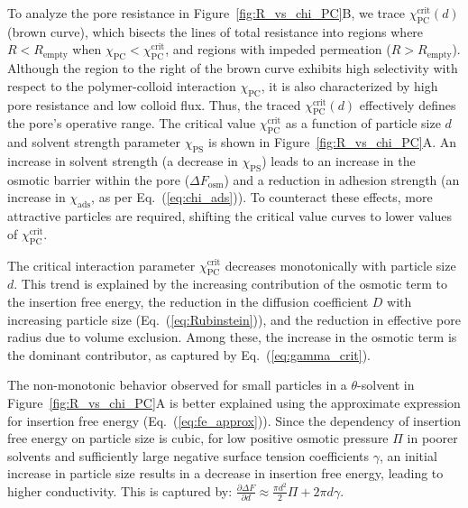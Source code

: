 \documentclass[12pt, a4paper]{article}
\begin{document}
To analyze the pore resistance in Figure~\ref{fig:R_vs_chi_PC}B, we trace $\chi_{\textrm{PC}}^{\textrm{crit}}(d)$ (brown curve), which bisects the lines of total resistance into regions where $R < R_{\textrm{empty}}$ when $\chi_{\textrm{PC}} < \chi_{\textrm{PC}}^{\textrm{crit}}$, and regions with impeded permeation ($R > R_{\textrm{empty}}$).
Although the region to the right of the brown curve exhibits high selectivity with respect to the polymer-colloid interaction $\chi_{\textrm{PC}}$, it is also characterized by high pore resistance and low colloid flux.
Thus, the traced $\chi_{\textrm{PC}}^{\textrm{crit}}(d)$ effectively defines the pore's operative range.
The critical value $\chi_{\textrm{PC}}^{\textrm{crit}}$ as a function of particle size $d$ and solvent strength parameter $\chi_{\text{PS}}$ is shown in Figure~\ref{fig:R_vs_chi_PC}A.
An increase in solvent strength (a decrease in $\chi_{\text{PS}}$) leads to an increase in the osmotic barrier within the pore ($\Delta F_{\text{osm}}$) and a reduction in adhesion strength (an increase in $\chi_{\text{ads}}$, as per Eq.~(\ref{eq:chi_ads})).
To counteract these effects, more attractive particles are required, shifting the critical value curves to lower values of $\chi_{\textrm{PC}}^{\textrm{crit}}$.

The critical interaction parameter $\chi_{\textrm{PC}}^{\textrm{crit}}$ decreases monotonically with particle size $d$. 
This trend is explained by the increasing contribution of the osmotic term to the insertion free energy, the reduction in the diffusion coefficient $D$ with increasing particle size (Eq.~(\ref{eq:Rubinstein})), and the reduction in effective pore radius due to volume exclusion.
Among these, the increase in the osmotic term is the dominant contributor, as captured by Eq.~(\ref{eq:gamma_crit}).

The non-monotonic behavior observed for small particles in a $\theta$-solvent in Figure~\ref{fig:R_vs_chi_PC}A is better explained using the approximate expression for insertion free energy (Eq.~(\ref{eq:fe_approx})).
Since the dependency of insertion free energy on particle size is cubic, for low positive osmotic pressure $\Pi$ in poorer solvents and sufficiently large negative surface tension coefficients $\gamma$, an initial increase in particle size results in a decrease in insertion free energy, leading to higher conductivity. This is captured by:
$
\frac{\partial \Delta F}{\partial d} \approx \frac{\pi d^2}{2} \Pi + 2\pi d \gamma.
$
\end{document}
